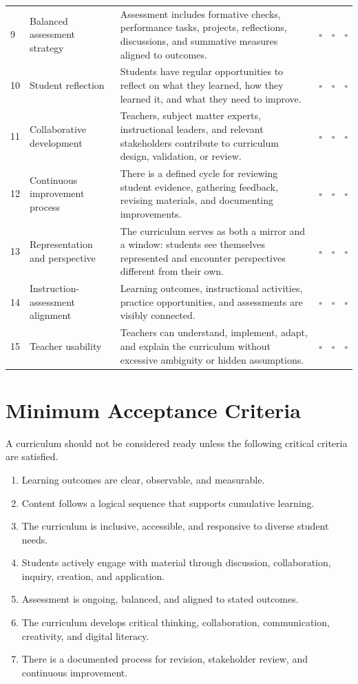 \documentclass[11pt]{article}
\newcommand{\checkbox}{\(\square\)}
\begin{document}
\begin{longtable}{L{0.25in} L{1.50in} L{3.10in} C{0.45in} C{0.45in} C{0.58in}}
9 & Balanced assessment strategy & Assessment includes formative checks, performance tasks, projects, reflections, discussions, and summative measures aligned to outcomes. & \checkbox & \checkbox & \checkbox \\
10 & Student reflection & Students have regular opportunities to reflect on what they learned, how they learned it, and what they need to improve. & \checkbox & \checkbox & \checkbox \\
11 & Collaborative development & Teachers, subject matter experts, instructional leaders, and relevant stakeholders contribute to curriculum design, validation, or review. & \checkbox & \checkbox & \checkbox \\
12 & Continuous improvement process & There is a defined cycle for reviewing student evidence, gathering feedback, revising materials, and documenting improvements. & \checkbox & \checkbox & \checkbox \\
13 & Representation and perspective & The curriculum serves as both a mirror and a window: students see themselves represented and encounter perspectives different from their own. & \checkbox & \checkbox & \checkbox \\
14 & Instruction-assessment alignment & Learning outcomes, instructional activities, practice opportunities, and assessments are visibly connected. & \checkbox & \checkbox & \checkbox \\
15 & Teacher usability & Teachers can understand, implement, adapt, and explain the curriculum without excessive ambiguity or hidden assumptions. & \checkbox & \checkbox & \checkbox \\
\end{longtable}
\setlength{\tabcolsep}{6pt}
\normalsize

\section{Minimum Acceptance Criteria}

A curriculum should not be considered ready unless the following critical criteria are satisfied.

\begin{enumerate}
  \item Learning outcomes are clear, observable, and measurable.
  \item Content follows a logical sequence that supports cumulative learning.
  \item The curriculum is inclusive, accessible, and responsive to diverse student needs.
  \item Students actively engage with material through discussion, collaboration, inquiry, creation, and application.
  \item Assessment is ongoing, balanced, and aligned to stated outcomes.
  \item The curriculum develops critical thinking, collaboration, communication, creativity, and digital literacy.
  \item There is a documented process for revision, stakeholder review, and continuous improvement.
\end{enumerate}
\end{document}
